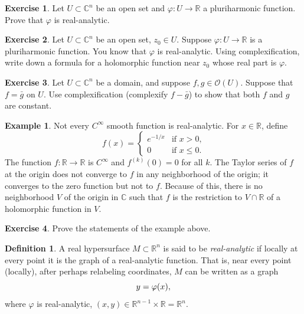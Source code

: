 \documentclass[12pt,openany]{book}
\newcommand{\avoidbreak}{\postdisplaypenalty=100}
\newcommand{\C}{{\mathbb{C}}}
\newcommand{\R}{{\mathbb{R}}}
\newcommand{\sO}{{\mathscr{O}}}
\theoremstyle{plain}
\theoremstyle{remark}
\theoremstyle{definition}
\newtheorem{defn}[thm]{Definition}
\newenvironment{exbox}{%
    \def\FrameCommand{\vrule width 1pt \relax\hspace{10pt}}%
    \MakeFramed{\advance\hsize-\width\FrameRestore}%
}{%
    \endMakeFramed
}
\theoremstyle{exercise}
\newtheorem{exercise}{Exercise}[section]
\theoremstyle{example}
\newtheorem{example}[thm]{Example}
\begin{document}
\begin{exbox}
\begin{exercise}
Let $U \subset \C^n$ be an open set and $\varphi \colon U \to \R$ a
pluriharmonic function.  Prove that $\varphi$ is real-analytic.
\end{exercise}

\begin{exercise}
Let $U \subset \C^n$ be an open set, $z_0 \in U$.
Suppose $\varphi \colon U \to \R$ is a pluriharmonic function.
You know that $\varphi$ is real-analytic.
Using complexification, write down a formula for a holomorphic function near
$z_0$ whose real part is $\varphi$.
\end{exercise}

\begin{exercise}
Let $U \subset \C^n$ be a domain, and suppose $f, g \in \sO(U)$.
Suppose that $f = \bar{g}$ on $U$.  Use complexification (complexify
$f-\bar{g}$) to show that both $f$ and $g$ are constant.
\end{exercise}
\end{exbox}

\begin{example}
Not every $C^\infty$ smooth function is real-analytic.  For $x \in \R$,
define
\begin{equation*}
f(x) =
\begin{cases}
e^{-1/x} & \text{if $x > 0$,} \\
0 & \text{if $x \leq 0$.}
\end{cases}
\end{equation*}
The function
$f \colon \R \to \R$ is $C^\infty$ and $f^{(k)}(0) = 0$ for all $k$.
The Taylor series of $f$ at the origin does
not converge to $f$ in any neighborhood of the origin; it converges to the
zero function but not to $f$.
Because of this, there is no neighborhood $V$ of the origin in $\C$ such that
$f$ is the restriction to $V \cap \R$ of a holomorphic function in $V$.
\end{example}

\begin{exbox}
\begin{exercise}
Prove the statements of the example above.
\end{exercise}
\end{exbox}

\begin{defn}
A real hypersurface $M \subset \R^n$ is said to be
\emph{real-analytic}
if locally at every point it is the graph of a real-analytic function.  That
is, near every point (locally), after perhaps relabeling coordinates,
$M$ can be written as
a graph
\begin{equation*}
y = \varphi(x) ,
\avoidbreak
\end{equation*}
where $\varphi$ is real-analytic, $(x,y) \in \R^{n-1} \times \R = \R^n$.
\end{defn}
\end{document}

